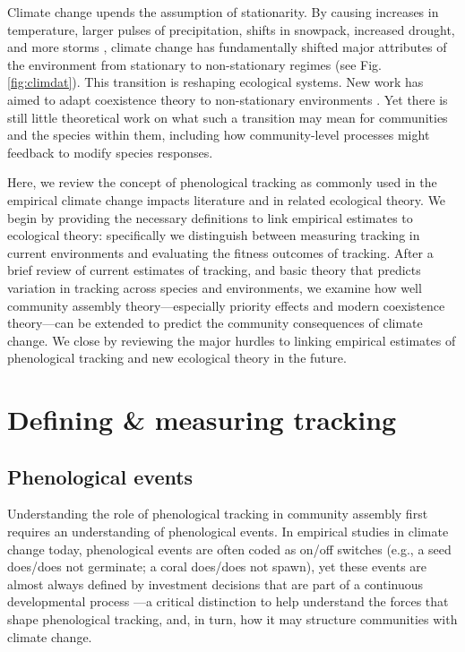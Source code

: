 \documentclass[11pt,letterpaper]{article}
\begin{document}
Climate change upends the assumption of stationarity. By causing increases in temperature, larger pulses of precipitation, shifts in snowpack, increased drought, and more storms \citep{ipcc2013}, climate change has fundamentally shifted major attributes of the environment from stationary to non-stationary regimes (see Fig. \ref{fig:climdat}). This transition is reshaping ecological systems. New work has aimed to adapt coexistence theory to non-stationary environments \citep{chessonnonstat,volkerass}. Yet there is still little theoretical work on what such a transition may mean for communities and the species within them, including how community-level processes might feedback to modify species responses.

Here, we review the concept of phenological tracking as commonly used in the empirical climate change impacts literature and in related ecological theory. We begin by providing the necessary definitions to link empirical estimates to ecological theory: specifically we distinguish between measuring tracking in current environments and evaluating the fitness outcomes of tracking. After a brief review of current estimates of tracking, and basic theory that predicts variation in tracking across species and environments, we examine how well community assembly theory---especially priority effects and modern coexistence theory---can be extended to predict the community consequences of climate change. We close by reviewing the major hurdles to linking empirical estimates of phenological tracking and new ecological theory in the future. %

\section{Defining \& measuring tracking}
\subsection{Phenological events}
Understanding the role of phenological tracking in community assembly first requires an understanding of phenological events. In empirical studies in climate change today, phenological events are often coded as on/off switches (e.g., a seed does/does not germinate; a coral does/does not spawn), yet these events are almost always defined by investment decisions that are part of a continuous developmental process \citep{chuinearees,inouye2019}---a critical distinction to help understand the forces that shape phenological tracking, and, in turn, how it may structure communities with climate change. 
\end{document}
